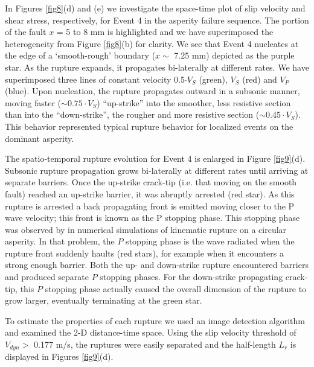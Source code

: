 \documentclass[preprint,1p, 10pt,authoryear]{elsarticle}
\begin{document}
In Figures \ref{fig8}(d) and (e) we investigate the space-time plot of slip velocity and shear stress, respectively, for Event 4 in the asperity failure sequence. The portion of the fault $x$ = 5 to 8 mm is highlighted and we have superimposed the heterogeneity from Figure \ref{fig8}(b) for clarity. We see that Event 4 nucleates at the edge of a `smooth-rough' boundary ($x \sim$ 7.25 mm) depicted as the purple star. As the rupture expands, it propagates bi-laterally at different rates. We have superimposed three lines of constant velocity 0.5$\cdot V_{S}$ (green), $V_{S}$ (red) and $V_{P}$ (blue).  Upon nucleation, the rupture propagates outward in a subsonic manner, moving faster ($\sim 0.75 \cdot V_{S}$) ``up-strike'' into the smoother, less resistive section than into the ``down-strike'', the rougher and more resistive section ($\sim 0.45\cdot V_{S}$). This behavior represented typical rupture behavior for localized events on the dominant asperity.

The spatio-temporal rupture evolution for Event 4 is enlarged in Figure \ref{fig9}(d).  Subsonic rupture propagation grows bi-laterally at different rates until arriving at separate barriers. Once the up-strike crack-tip (i.e. that moving on the smooth fault) reached an up-strike barrier, it was abruptly arrested (red star).  As this rupture is arrested a back propagating front is emitted moving closer to the P wave velocity; this front is known as the P stopping phase. This stopping phase was observed by \citet{Madariaga1976} in numerical simulations of kinematic rupture on a circular asperity.  In that problem, the $P$ stopping phase is the wave radiated when the rupture front suddenly haults (red stars), for example when it encounters a strong enough barrier.  Both the up- and down-strike rupture encountered barriers and produced separate $P$ stopping phases.  For the down-strike propagating crack-tip, this $P$ stopping phase actually caused the overall dimension of the rupture to grow larger, eventually terminating at the green star. 

To estimate the properties of each rupture we used an image detection algorithm \citep{Gonzalez2009} and examined the 2-D distance-time space. Using the slip velocity threshold of $V_{dyn}>$ 0.177 m/s, the ruptures were easily separated and the half-length $L_{r}$ is displayed in Figures \ref{fig9}(d).
\end{document}
